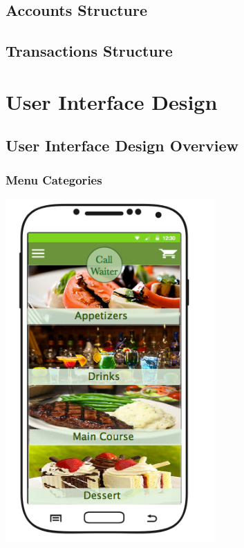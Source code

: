 \documentclass[12pt, titlepage]{article}
\begin{document}
\subsection{Accounts Structure}



\subsection{Transactions Structure}

\section{User Interface Design}

\subsection{User Interface Design Overview}

\subsubsection{Menu Categories}
\includegraphics[width=80mm,scale=0.5]{MenuCategories.png}
\end{document}
